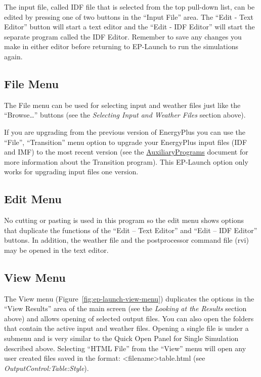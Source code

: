 The input file, called IDF file that is selected from the top pull-down list, can be edited by pressing one of two buttons in the ``Input File'' area. The ``Edit - Text Editor'' button will start a text editor and the ``Edit - IDF Editor'' will start the separate program called the IDF Editor. Remember to save any changes you make in either editor before returning to EP-Launch to run the simulations again.

\subsection{File Menu}\label{file-menu}

The File menu can be used for selecting input and weather files just like the ``Browse\ldots{}'' buttons (see the \emph{Selecting Input and Weather Files} section above).

If you are upgrading from the previous version of EnergyPlus you can use the ``File'', ``Transition'' menu option to upgrade your EnergyPlus input files (IDF and IMF) to the most recent version (see the \href{AuxiliaryPrograms.pdf}{AuxiliaryPrograms} document for more information about the Transition program). This EP-Launch option only works for upgrading input files one version.

\subsection{Edit Menu}\label{edit-menu}

No cutting or pasting is used in this program so the edit menu shows options that duplicate the functions of the ``Edit -- Text Editor'' and ``Edit -- IDF Editor'' buttons. In addition, the weather file and the postprocessor command file (rvi) may be opened in the text editor.

\subsection{View Menu}\label{view-menu}

The View menu (Figure~\ref{fig:ep-launch-view-menu}) duplicates the options in the ``View Results'' area of the main screen (see the \emph{Looking at the Results} section above) and allows opening of selected output files. You can also open the folders that contain the active input and weather files. Opening a single file is under a submenu and is very similar to the Quick Open Panel for Single Simulation described above. Selecting ``HTML File'' from the ``View'' menu will open any user created files saved in the format: \textless{}filename\textgreater{}table.html (see \emph{OutputControl:Table:Style}).


